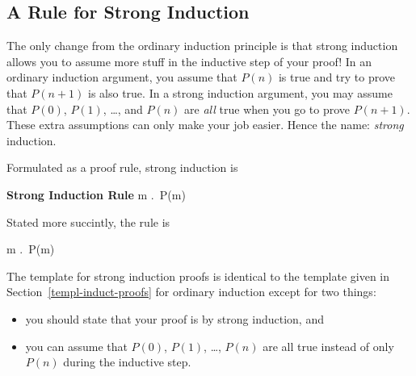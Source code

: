 \subsection{A Rule for Strong Induction}


The only change from the ordinary induction principle is that strong
induction allows you to assume more stuff in the inductive step of
your proof!  In an ordinary induction argument, you assume that $P(n)$
is true and try to prove that $P(n+1)$ is also true.  In a strong
induction argument, you may assume that $P(0)$, $P(1)$, \dots, and
$P(n)$ are \emph{all} true when you go to prove $P(n+1)$.  These extra
assumptions can only make your job easier.  Hence the name:
\emph{strong} induction.

Formulated as a proof rule, strong induction is
\begin{rul*} \textbf{Strong Induction Rule}
{\forall m \in \naturals.\, P(m)}
\end{rul*}

Stated more succintly, the rule is
\begin{rul*}%
{\forall m \in \naturals.\, P(m)}
\end{rul*}

The template for strong induction proofs is identical to the template
given in Section~\ref{templ-induct-proofs} for ordinary induction
except for two things:
\begin{itemize}

\item
you should state that your proof is by strong induction, and

\item
you can assume that $P(0)$, $P(1)$, \dots, $P(n)$ are all true instead
of only $P(n)$ during the inductive step.

\end{itemize}

